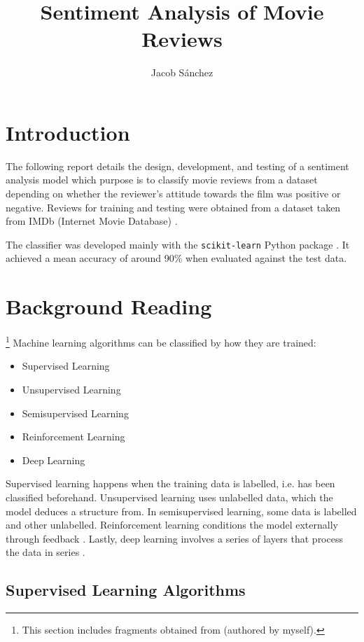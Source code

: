 \documentclass[a4paper,12pt]{article}
\title{Sentiment Analysis of Movie Reviews}
\author{Jacob Sánchez}
\date{} %
\begin{document}
\maketitle


\section{Introduction}

The following report details the design, development, and testing of a sentiment
analysis model which purpose is to classify movie reviews from a dataset depending
on whether the reviewer's attitude towards the film was positive or negative.
Reviews for training and testing were obtained from a dataset taken from IMDb
(Internet Movie Database) \parencite{maas2011ACL}.

The classifier was developed mainly with the \texttt{scikit-learn} Python
package \parencite{Pedregosa2011}.
It achieved a mean accuracy of around 90\% when evaluated against the test data.

\section{Background Reading}
\footnote{This section includes fragments obtained from \textcite{Sanchez2022}
(authored by myself).}
Machine learning algorithms can be classified by how they are trained:

\begin{itemize}
 \item Supervised Learning
 \item Unsupervised Learning
 \item Semisupervised Learning
 \item Reinforcement Learning
 \item Deep Learning
\end{itemize}

Supervised learning happens when the training data is labelled,
i.e. has been classified beforehand.
Unsupervised learning uses unlabelled data, which the model deduces a structure from.
In semisupervised learning, some data is labelled and other unlabelled.
Reinforcement learning conditions the model externally through feedback
\parencite[11]{Ibrahim2021}.
Lastly, deep learning involves a series of layers that process the data in series \parencite[13]{Ibrahim2021}.

\subsection{Supervised Learning Algorithms}
\end{document}

